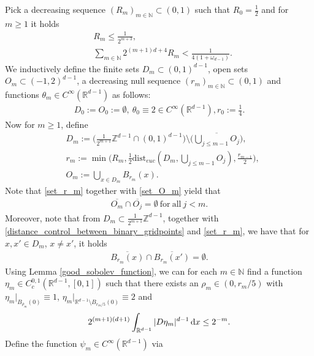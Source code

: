 \documentclass[a4paper,10pt]{article}
\numberwithin{equation}{section}
\newcommand{\R}{\mathbb{R}}
\newcommand{\N}{\mathbb{N}}
\newcommand{\Z}{\mathbb{Z}}
\newcommand{\dist}{\mathrm{dist}}
\newcommand{\di}{{\rm d}}
\begin{document}
 Pick a decreasing sequence $(R_m)_{m \in \N} \subset (0,1)$ such that $R_0 = \frac{1}{2}$ and for $m \geq 1$ it holds
\begin{align}
    & R_m \leq \frac{1}{2^{m+3}}, \label{distance_control_between_binary_gridpoints}\\
    &\sum_{m \in \N} 2^{(m+1)d+4}R_m < \frac{1}{4(1+\omega_{d-1})} \label{lebesgue_and_diameter_control}.
\end{align}
We inductively define the finite sets $D_m \subset (0,1)^{d-1}$, open sets $O_m \subset (-1,2)^{d-1}$, a decreasing null sequence $(r_m)_{m \in \N} \subset (0,1)$ and functions $\theta_m \in C^\infty(\R^{d-1})$ as follows: 
\begin{align*}
    D_0:=O_0 := \emptyset, \ \theta_0 \equiv 2 \in C^\infty(\R^{d-1}), r_0 := \frac{1}{4}.
\end{align*}
Now for $m \geq 1$, define 
\begin{align}
    &D_m := \Big(\frac{1}{2^{m+1}} \Z^{d-1} \cap (0,1)^{d-1}\Big) \setminus \overline{\big(\bigcup_{j \leq m-1}O_j\big)}, \label{set_D_m} \\
    &r_m:= \min\Big(R_m, \frac{1}{2}\dist_{euc}(D_m, \bigcup_{j \leq m-1}O_j), \frac{r_{m-1}}{2}\Big), \label{set_r_m} \\
    &O_m := \bigcup_{x \in D_m} B_{r_m}(x) \label{set_O_m}. 
\end{align}
Note that \eqref{set_r_m} together with \eqref{set_O_m} yield that 
\begin{align}\label{disjoint_Os}
    \overline{O_m} \cap \overline{O_j} = \emptyset \ \mathrm{for\ all\ } j < m.
\end{align}
Moreover, note that from $D_m \subset \frac{1}{2^{m+1}} \Z^{d-1}$, together with \eqref{distance_control_between_binary_gridpoints} and \eqref{set_r_m}, we have that for $x, x' \in D_m$, $x \neq x'$, it holds 
\begin{align}\label{m-th_gridpoints_are_separated}
    \overline{B_{r_m}(x)} \cap \overline{B_{r_m}(x')} = \emptyset.
\end{align}
Using Lemma \ref{good_sobolev_function}, we can for each $m \in \N$ find a function $\eta_m \in C_c^{0,1} (\R^{d-1}, [0,1])$ such that there exists an $\rho_m \in (0, r_m/5)$ with $\eta_m|_{B_{\rho_m}(0)} \equiv 1$, $\eta_m|_{\R^{d-1} \setminus B_{r_m/5}(0)} \equiv 2$ and 
\begin{align}\label{eta_m_sobolev_norm}
    2^{(m+1)(d+1)}\int_{\R^{d-1}} |D\eta_m|^{d-1}\, \di x \leq 2^{-m}.
\end{align}
Define the function $\psi_m \in C^\infty(\R^{d-1})$ via 
\end{document}
